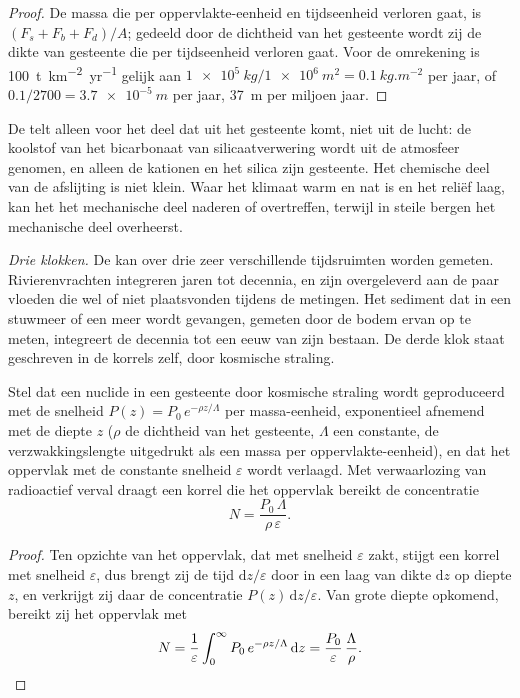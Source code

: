 \begin{proof}
De massa die per oppervlakte-eenheid en tijdseenheid verloren gaat, is $(F_s + F_b + F_d)/A$; gedeeld door de dichtheid van het gesteente wordt zij de dikte van gesteente die per tijdseenheid verloren gaat. Voor de omrekening is \qty{100}{t.km^{-2}.yr^{-1}} gelijk aan
$\qty{1e5}{kg}/\qty{1e6}{m^2} = \qty{0.1}{kg.m^{-2}}$ per jaar, of
$0.1/2700 = \qty{3.7e-5}{m}$ per jaar, \qty{37}{m} per miljoen jaar.
\end{proof}

De  telt alleen voor het deel dat uit het gesteente komt, niet uit de lucht: de koolstof van het bicarbonaat van silicaatverwering wordt uit de atmosfeer genomen, en alleen de kationen en het silica zijn gesteente. Het chemische deel van de afslijting is niet klein. Waar het klimaat warm en nat is en het reliëf laag, kan het het mechanische deel naderen of overtreffen, terwijl in steile bergen het mechanische deel overheerst.

\emph{Drie klokken.} De  kan over drie zeer verschillende tijdsruimten worden gemeten. Rivierenvrachten integreren jaren tot decennia, en zijn overgeleverd aan de paar vloeden die wel of niet plaatsvonden tijdens de metingen. Het sediment dat in een stuwmeer of een meer wordt gevangen, gemeten door de bodem ervan op te meten, integreert de decennia tot een eeuw van zijn bestaan. De derde klok staat geschreven in de korrels zelf, door kosmische straling.

\begin{proposition}\label{prop:b1:erosion-transport:cosmogenic}
Stel dat een nuclide in een gesteente door kosmische straling wordt geproduceerd met de snelheid $P(z) = P_0\,e^{-\rho z/\Lambda}$ per massa-eenheid, exponentieel afnemend met de diepte $z$ ($\rho$ de dichtheid van het gesteente, $\Lambda$ een constante, de verzwakkingslengte uitgedrukt als een massa per oppervlakte-eenheid), en dat het oppervlak met de constante snelheid $\varepsilon$ wordt verlaagd. Met verwaarlozing van radioactief verval draagt een korrel die het oppervlak bereikt de concentratie
\[
  N = \frac{P_0\,\Lambda}{\rho\,\varepsilon}.
\]
\end{proposition}

\begin{proof}
Ten opzichte van het oppervlak, dat met snelheid $\varepsilon$ zakt, stijgt een korrel met snelheid $\varepsilon$, dus brengt zij de tijd $\mathrm dz/\varepsilon$ door in een laag van dikte $\mathrm dz$ op diepte $z$, en verkrijgt zij daar de concentratie $P(z)\,\mathrm dz/\varepsilon$. Van grote diepte opkomend, bereikt zij het oppervlak met
\[
  N = \frac{1}{\varepsilon}\int_0^{\infty} P_0\,e^{-\rho z/\Lambda}\,\mathrm dz
  = \frac{P_0}{\varepsilon}\,\frac{\Lambda}{\rho}. \qedhere
\]
\end{proof}

